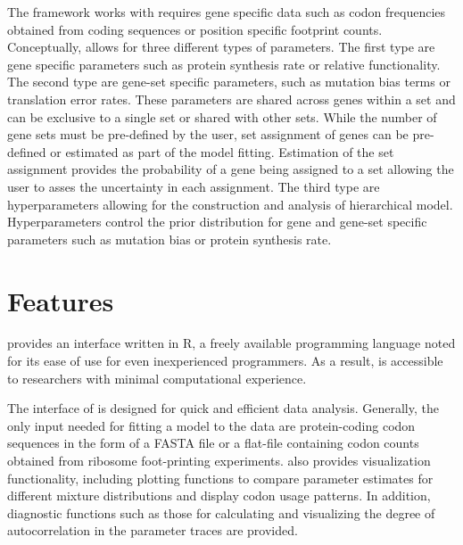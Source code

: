 The \package framework works with \package requires gene specific data such as codon frequencies obtained from coding sequences or position specific footprint counts.
Conceptually, \package allows for three different types of parameters.
The first type are gene specific parameters such as protein synthesis rate or relative functionality.
The second type are gene-set specific parameters, such as mutation bias terms or translation error rates.
These parameters are shared across genes within a set and can be exclusive to a single set or shared with other sets.
While the number of gene sets must be pre-defined by the user, set assignment of genes can be pre-defined or estimated as part of the model fitting.
Estimation of the set assignment provides the probability of a gene being assigned to a set allowing the user to asses the uncertainty in each assignment.
The third type are hyperparameters allowing for the construction and analysis of hierarchical model. 
Hyperparameters control the prior distribution for gene and gene-set specific parameters such as mutation bias or protein synthesis rate.

\section{Features}
\package provides an interface written in R, a freely available programming language noted for its ease of use for even inexperienced programmers. 
As a result, \package is accessible to researchers with minimal computational experience. 

The interface of \package is designed for quick and efficient data analysis.
Generally, the only input needed for fitting a model to the data are protein-coding codon sequences in the form of a FASTA file or a flat-file containing codon counts obtained from ribosome foot-printing experiments. 
\package also provides visualization functionality, including plotting functions to compare parameter estimates for different mixture distributions and display codon usage patterns. 
In addition, diagnostic functions such as those for calculating and visualizing the degree of autocorrelation in the parameter traces are provided.

